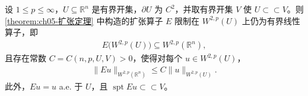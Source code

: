 \documentclass[../../main.tex]{subfiles}%
\begin{document}
\begin{theorem}[$W^{2,p}$ 扩张定理]\label{theorem:ch05-W2p扩张}
设 $1\leqslant p\leqslant\infty$，$U\subseteq\mathbb{R}^{n}$ 是有界开集，$\partial U$ 为 $C^{2}$，并取有界开集 $V$ 使 $U\subset\subset V$。则 \cref{theorem:ch05-扩张定理} 中构造的扩张算子 $E$ 限制在 $W^{2,p}(U)$ 上仍为有界线性算子，即
\begin{align*}
E\bigl(W^{2,p}(U)\bigr)\subseteq W^{2,p}(\mathbb{R}^{n}),
\end{align*}
且存在常数 $C=C(n,p,U,V)>0$，使得对每个 $u\in W^{2,p}(U)$，
\begin{align}
\|Eu\|_{W^{2,p}(\mathbb{R}^{n})}\leqslant C\|u\|_{W^{2,p}(U)}.
\label{eq:ch05-W2p-extension-estimate}
\end{align}
此外，$Eu=u$ a.e. 于 $U$，且 $\operatorname{spt}Eu\subset\subset V$。
\end{theorem}
\end{document}
